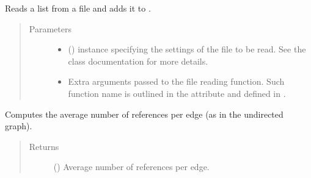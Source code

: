\documentclass[letterpaper,10pt,english]{sphinxmanual}
\begin{document}
\begin{fulllineitems}
\begin{fulllineitems}
\label{\detokenize{reference:pypath.main.PyPath.read_list_file}}
Reads a list from a file and adds it to
.
\begin{quote}\begin{description}
\item[{Parameters}] \leavevmode\begin{itemize}
\item {} 
 () \textendash{}  instance specifying
the settings of the file to be read. See the class
documentation for more details.

\item {} 
 \textendash{} Extra arguments passed to the file reading function. Such
function name is outlined in the
 attribute and
defined in .

\end{itemize}

\end{description}\end{quote}

\end{fulllineitems}


\begin{fulllineitems}
\label{\detokenize{reference:pypath.main.PyPath.reference_edge_ratio}}
Computes the average number of references per edge (as in the
undirected graph).
\begin{quote}\begin{description}
\item[{Returns}] \leavevmode
() \textendash{} Average number of references per edge.

\end{description}\end{quote}


\end{fulllineitems}
\end{fulllineitems}
\end{document}
